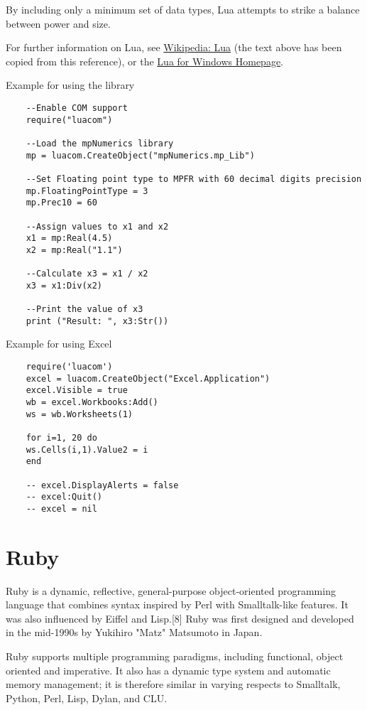 	\vpara
	By including only a minimum set of data types, Lua attempts to strike a balance between power and size.
	
	For further information on Lua, see \href{http://en.wikipedia.org/wiki/Lua_(programming_language)}{Wikipedia: Lua} (the text above has been copied from this reference), or the  \href{http://code.google.com/p/luaforwindows/}{Lua for Windows Homepage}.
	
	
	\vpara
	Example for using the library
	
	\begin{lstlisting}
	--Enable COM support
	require("luacom")
	
	--Load the mpNumerics library
	mp = luacom.CreateObject("mpNumerics.mp_Lib")
	
	--Set Floating point type to MPFR with 60 decimal digits precision
	mp.FloatingPointType = 3
	mp.Prec10 = 60
	
	--Assign values to x1 and x2
	x1 = mp:Real(4.5)
	x2 = mp:Real("1.1")
	
	--Calculate x3 = x1 / x2
	x3 = x1:Div(x2)
	
	--Print the value of x3
	print ("Result: ", x3:Str())
	\end{lstlisting}
	
	
	\vpara
	Example for using Excel
	
	\begin{lstlisting}
	require('luacom')
	excel = luacom.CreateObject("Excel.Application")
	excel.Visible = true
	wb = excel.Workbooks:Add()
	ws = wb.Worksheets(1)
	
	for i=1, 20 do
	ws.Cells(i,1).Value2 = i
	end
	
	-- excel.DisplayAlerts = false
	-- excel:Quit()
	-- excel = nil
	\end{lstlisting}
	
	
	
	\newpage
	\section{Ruby}
	Ruby is a dynamic, reflective, general-purpose object-oriented programming language that combines syntax inspired by Perl with Smalltalk-like features. It was also influenced by Eiffel and Lisp.[8] Ruby was first designed and developed in the mid-1990s by Yukihiro "Matz" Matsumoto in Japan.
	
	\vpara
	Ruby supports multiple programming paradigms, including functional, object oriented and imperative. It also has a dynamic type system and automatic memory management; it is therefore similar in varying respects to Smalltalk, Python, Perl, Lisp, Dylan, and CLU.
	
